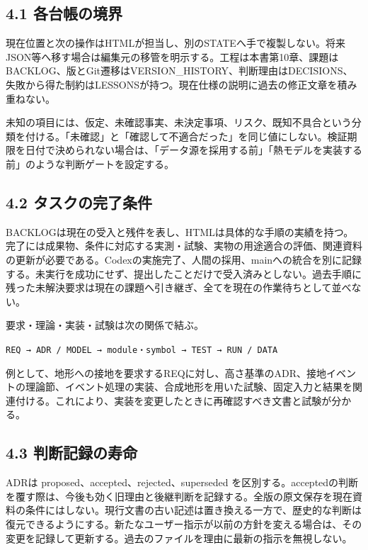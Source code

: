 \documentclass[11pt,a4paper]{article}
\begin{document}
\subsection{4.1
各台帳の境界}\label{ux5404ux53f0ux5e33ux306eux5883ux754c}

現在位置と次の操作はHTMLが担当し、別のSTATEへ手で複製しない。将来JSON等へ移す場合は編集元の移管を明示する。工程は本書第10章、課題はBACKLOG、版とGit遷移はVERSION\_HISTORY、判断理由はDECISIONS、失敗から得た制約はLESSONSが持つ。現在仕様の説明に過去の修正文章を積み重ねない。

未知の項目には、仮定、未確認事実、未決定事項、リスク、既知不具合という分類を付ける。「未確認」と「確認して不適合だった」を同じ値にしない。検証期限を日付で決められない場合は、「データ源を採用する前」「熱モデルを実装する前」のような判断ゲートを設定する。

\subsection{4.2
タスクの完了条件}\label{ux30bfux30b9ux30afux306eux5b8cux4e86ux6761ux4ef6}

BACKLOGは現在の受入と残件を表し、HTMLは具体的な手順の実績を持つ。完了には成果物、条件に対応する実測・試験、実物の用途適合の評価、関連資料の更新が必要である。Codexの実施完了、人間の採用、mainへの統合を別に記録する。未実行を成功にせず、提出したことだけで受入済みとしない。過去手順に残った未解決要求は現在の課題へ引き継ぎ、全てを現在の作業待ちとして並べない。

要求・理論・実装・試験は次の関係で結ぶ。

\texttt{REQ\ →\ ADR\ /\ MODEL\ →\ module・symbol\ →\ TEST\ →\ RUN\ /\ DATA}

例として、地形への接地を要求するREQに対し、高さ基準のADR、接地イベントの理論節、イベント処理の実装、合成地形を用いた試験、固定入力と結果を関連付ける。これにより、実装を変更したときに再確認すべき文書と試験が分かる。

\subsection{4.3
判断記録の寿命}\label{ux5224ux65adux8a18ux9332ux306eux5bffux547d}

ADRは proposed、accepted、rejected、superseded
を区別する。acceptedの判断を覆す際は、今後も効く旧理由と後継判断を記録する。全版の原文保存を現在資料の条件にはしない。現行文書の古い記述は置き換える一方で、歴史的な判断は復元できるようにする。新たなユーザー指示が以前の方針を変える場合は、その変更を記録して更新する。過去のファイルを理由に最新の指示を無視しない。
\end{document}
